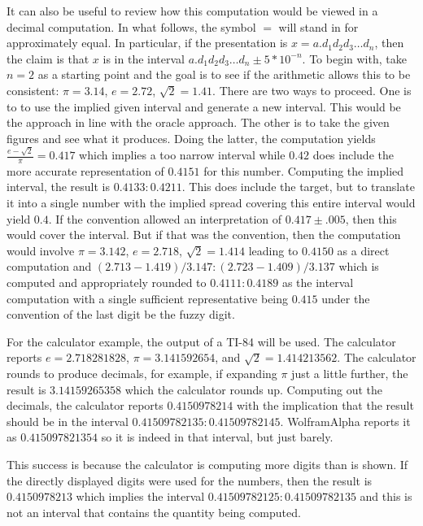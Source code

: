 \documentclass[12pt]{article}
\theoremstyle{remark}
\begin{document}
It can also be useful to review how this computation would be viewed in a decimal computation. In what follows, the symbol $=$ will stand in for approximately equal. In particular, if the presentation is $x = a.d_1d_2d_3\ldots d_n$, then the claim is that $x$ is in the interval $a.d_1d_2d_3\ldots d_n \pm 5*10^{-n}$. To begin with, take $n=2$ as a starting point and the goal is to see if the arithmetic allows this to be consistent: $\pi = 3.14$, $e=2.72$, $\sqrt{2} = 1.41$. There are two ways to proceed. One is to to use the implied given interval and generate a new interval. This would be the approach in line with the oracle approach. The other is to take the given figures and see what it produces. Doing the latter, the computation yields $
\frac{e-\sqrt{2}}{\pi} = 0.417$ which implies a too narrow interval while $0.42$ does include the more accurate representation of $0.4151$ for this number. Computing the implied interval, the result is $0.4133:0.4211$. This does include the target, but to translate it into a single number with the implied spread covering this entire interval would yield $0.4$. If the convention allowed an interpretation of $0.417 \pm .005$, then this would cover the interval. But if that was the convention, then the computation would involve $\pi = 3.142$, $e=2.718$, $\sqrt{2} = 1.414$ leading to $0.4150$ as a direct computation and $(2.713 - 1.419)/3.147:(2.723 - 1.409)/3.137$ which is computed and appropriately rounded to $0.4111:0.4189$ as the interval computation with a single sufficient representative being $0.415$ under the convention of the last digit be the fuzzy digit.

For the calculator example, the output of a TI-84 will be used. The calculator reports  $e = 2.718281828$, $\pi = 3.141592654$, and $\sqrt{2} = 1.414213562$. The calculator rounds to produce decimals, for example, if expanding $\pi $ just a little further, the result is  $3.14159265358$ which the calculator rounds up. Computing out the decimals, the calculator reports $0.4150978214$ with the implication that the result should be in the interval $0.41509782135:0.41509782145$.  WolframAlpha reports it as $0.415097821354$ so it is indeed in that interval, but just barely. 

This success is because the calculator is computing more digits than is shown. If the directly displayed digits were used for the numbers, then the result is $0.4150978213$ which implies the interval $0.41509782125:0.41509782135$ and this is not an interval that contains the quantity being computed. 
\end{document}
